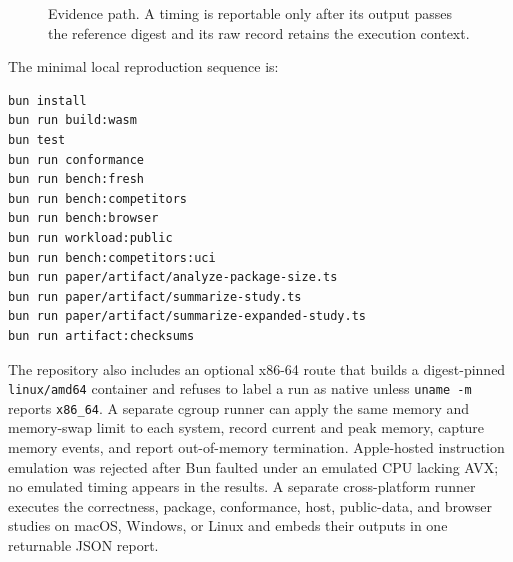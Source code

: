 \documentclass[pdflatex,sn-basic,Numbered]{sn-jnl}
\begin{document}
\begin{figure}[t]
\centering
{}
\caption{Evidence path. A timing is reportable only after its output passes the reference digest and its raw record retains the execution context.}\label{fig:evidence}
\end{figure}

The minimal local reproduction sequence is:

\begin{lstlisting}[language=bash]
bun install
bun run build:wasm
bun test
bun run conformance
bun run bench:fresh
bun run bench:competitors
bun run bench:browser
bun run workload:public
bun run bench:competitors:uci
bun run paper/artifact/analyze-package-size.ts
bun run paper/artifact/summarize-study.ts
bun run paper/artifact/summarize-expanded-study.ts
bun run artifact:checksums
\end{lstlisting}

The repository also includes an optional x86-64 route that builds a digest-pinned \texttt{linux/amd64} container and refuses to label a run as native unless \texttt{uname -m} reports \texttt{x86\_64}. A separate cgroup runner can apply the same memory and memory-swap limit to each system, record current and peak memory, capture memory events, and report out-of-memory termination. Apple-hosted instruction emulation was rejected after Bun faulted under an emulated CPU lacking AVX; no emulated timing appears in the results. A separate cross-platform runner executes the correctness, package, conformance, host, public-data, and browser studies on macOS, Windows, or Linux and embeds their outputs in one returnable JSON report.
\end{document}
